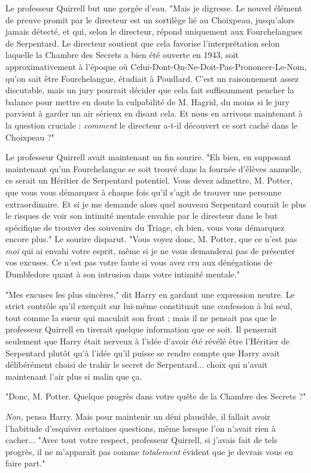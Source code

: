 Le professeur Quirrell but une gorgée d'eau. "Mais je digresse. Le nouvel élément de preuve promit par le directeur est un sortilège lié au Choixpeau, jusqu'alors jamais détecté, et qui, selon le directeur, répond uniquement aux Fourchelangues de Serpentard. Le directeur soutient que cela favorise l'interprétation selon laquelle la Chambre des Secrets a bien été ouverte en 1943, soit approximativement à l'époque où Celui-Dont-On-Ne-Doit-Pas-Prononcer-Le-Nom, qu'on sait être Fourchelangue, étudiait à Poudlard. C'est un raisonnement assez discutable, mais un jury pourrait décider que cela fait suffisamment pencher la balance pour mettre en doute la culpabilité de M. Hagrid, du moins si le jury parvient à garder un air sérieux en disant cela. Et nous en arrivons maintenant à la question cruciale : \emph{comment}  le directeur a-t-il découvert ce sort caché dans le Choixpeau ?"

Le professeur Quirrell avait maintenant un fin sourire. "Eh bien, en supposant maintenant qu'un Fourchelangue se soit trouvé dans la fournée d'élèves annuelle, ce serait un Héritier de Serpentard potentiel. Vous devez admettre, M. Potter, que vous vous démarquez à chaque fois qu'il s'agit de trouver une personne extraordinaire. Et si je me demande alors quel nouveau Serpentard courait le plus le risques de voir son intimité mentale envahie par le directeur dans le but spécifique de trouver des souvenirs du Triage, eh bien, vous vous démarquez encore plus." Le sourire disparut. "Vous voyez donc, M. Potter, que ce n'est pas \emph{moi}  qui ai envahi votre esprit, même si je ne vous demanderai pas de présenter vos excuses. Ce n'est pas votre faute si vous avez cru aux dénégations de Dumbledore quant à son intrusion dans votre intimité mentale."

"Mes excuses les plus sincères," dit Harry en gardant une expression neutre. Le strict contrôle qu'il exerçait sur lui-même constituait une confession à lui seul, tout comme la sueur qui maculait son front ; mais il ne pensait pas que le professeur Quirrell en tirerait quelque information que ce soit. Il penserait seulement que Harry était nerveux à l'idée d'avoir été révélé être l'Héritier de Serpentard plutôt qu'à l'idée qu'il puisse se rendre compte que Harry avait délibérément choisi de trahir le secret de Serpentard... choix qui n'avait maintenant l'air plus si malin que ça.

"Donc, M. Potter. Quelque progrès dans votre quête de la Chambre des Secrets ?"

\emph{Non,}  pensa Harry. Mais pour maintenir un déni plausible, il fallait avoir l'habitude d'esquiver certaines questions, même lorsque l'on n'avait rien à cacher... "Avec tout votre respect, professeur Quirrell, si j'avais fait de tels progrès, il ne m'apparaît pas comme \emph{totalement}  évident que je devrais vous en faire part."

